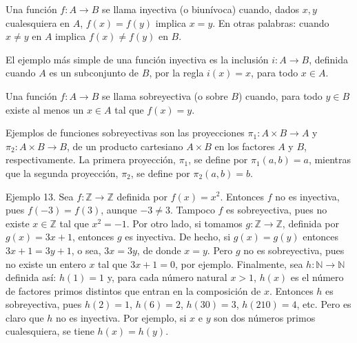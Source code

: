Una función \(f: A \to B\) se llama inyectiva (o biunívoca) cuando, dados \(x, y\) cualesquiera en \(A\), \(f(x) = f(y)\) implica \(x = y\). En otras palabras: cuando \(x \neq y\) en \(A\) implica \(f(x) \neq f(y)\) en \(B\).

El ejemplo más simple de una función inyectiva es la inclusión \(i: A \to B\), definida cuando \(A\) es un subconjunto de \(B\), por la regla \(i(x) = x\), para todo \(x \in A\).

Una función \(f: A \to B\) se llama sobreyectiva (o sobre \(B\)) cuando, para todo \(y \in B\) existe al menos un \(x \in A\) tal que \(f(x) = y\).

Ejemplos de funciones sobreyectivas son las proyecciones \(\pi_1: A \times B \to A\) y \(\pi_2: A \times B \to B\), de un producto cartesiano \(A \times B\) en los factores \(A\) y \(B\), respectivamente. La primera proyección, \(\pi_1\), se define por \(\pi_1(a, b) = a\), mientras que la segunda proyección, \(\pi_2\), se define por \(\pi_2(a, b) = b\).

Ejemplo 13. Sea \(f: \mathbb{Z} \to \mathbb{Z}\) definida por \(f(x) = x^2\). Entonces \(f\) no es inyectiva, pues \(f(-3) = f(3)\), aunque \(-3 \neq 3\). Tampoco \(f\) es sobreyectiva, pues no existe \(x \in \mathbb{Z}\) tal que \(x^2 = -1\). Por otro lado, si tomamos \(g: \mathbb{Z} \to \mathbb{Z}\), definida por \(g(x) = 3x + 1\), entonces \(g\) es inyectiva. De hecho, si \( g(x) = g(y) \) entonces \( 3x + 1 = 3y + 1 \), o sea, \( 3x = 3y \), de donde \( x = y \). Pero \( g \) no es sobreyectiva, pues no existe un entero \( x \) tal que \( 3x + 1 = 0 \), por ejemplo. Finalmente, sea \( h: \mathbb{N} \to \mathbb{N} \) definida así: \( h(1) = 1 \) y, para cada número natural \( x > 1 \), \( h(x) \) es el número de factores primos distintos que entran en la composición de \( x \). Entonces \( h \) es sobreyectiva, pues \( h(2) = 1 \), \( h(6) = 2 \), \( h(30) = 3 \), \( h(210) = 4 \), etc. Pero es claro que \( h \) no es inyectiva. Por ejemplo, si \( x \) e \( y \) son dos números primos cualesquiera, se tiene \( h(x) = h(y) \).

